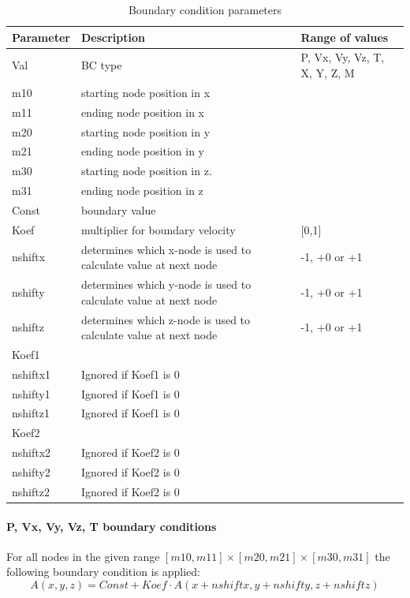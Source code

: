 \begin{table}[H]
\small
\centering
\begin{tabular}{l l l}
\toprule
Parameter & Description & Range of values \\
\midrule
Val & BC type & P, Vx, Vy, Vz, T, X, Y, Z, M \\
m10 & starting node position in x &  \\ 
m11 & ending node position in x &  \\ 
m20 & starting node position in y &  \\ 
m21 & ending node position in y &  \\ 
m30 & starting node position in z. &  \\ 
m31 & ending node position in z &  \\ 
Const & boundary value &  \\ 
Koef &  multiplier for boundary velocity & [0,1] \\ 
nshiftx & determines which x-node is used to calculate value at next node & -1, +0 or +1 \\ 
nshifty & determines which y-node is used to calculate value at next node & -1, +0 or +1 \\ 
nshiftz & determines which z-node is used to calculate value at next node & -1, +0 or +1 \\ 
Koef1 &  &  \\ 
nshiftx1 & Ignored if Koef1 is 0 &  \\ 
nshifty1 & Ignored if Koef1 is 0 &  \\ 
nshiftz1 & Ignored if Koef1 is 0 &  \\ 
Koef2 &  &  \\ 
nshiftx2 & Ignored if Koef2 is 0 &  \\ 
nshifty2 & Ignored if Koef2 is 0 &  \\ 
nshiftz2 & Ignored if Koef2 is 0 &  \\ 
\bottomrule
\end{tabular}
\caption{Boundary condition parameters}
\label{tbl:BC_parameters}
\end{table}

\paragraph{P, Vx, Vy, Vz, T boundary conditions}
For all nodes in the given range $[m10,m11]\times[m20,m21]\times[m30,m31]$ the following boundary condition is applied:
\begin{equation}\label{eqs:PVT_BC_general}
A(x,y,z) = Const + Koef \cdot A(x+nshiftx,y+nshifty,z+nshiftz)
\end{equation}

